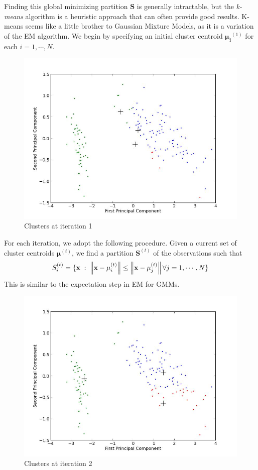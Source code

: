 Finding this global minimizing partition $\mathbf{S}$ is generally intractable, but the \emph{k-means} algorithm is a heuristic approach that can often provide good results. K-means seems like a little brother to Gaussian Mixture Models, as it is a variation of the EM algorithm. We begin by specifying an initial cluster centroid $\mathbf{\mu_{i}}^{(1)}$ for each $i = 1, \cdots, N$.

\begin{figure}[h]
\centering
\includegraphics[width=\textwidth]{iteration1.jpg}
\caption{Clusters at iteration 1}
\end{figure}

For each iteration, we adopt the following procedure. Given a current set of cluster centroids $\mathbf{\mu}^{(t)}$, we find a partition $\mathbf{S}^{(t)}$ of the observations such that 
\begin{equation*}
S_{i}^{(t)} = \{\mathbf{x} \; : \; \left\lVert\mathbf{x} - \mathbf{\mu}_{i}^{(t)}\right\rVert \leq \left\lVert\mathbf{x} - \mathbf{\mu}_{j}^{(t)}\right\rVert \forall j = 1, \cdots, N\}
\end{equation*}
This is similar to the expectation step in EM for GMMs.

\begin{figure}[h]
\centering
\includegraphics[width=\textwidth]{iteration2.jpg}
\caption{Clusters at iteration 2}
\end{figure}

